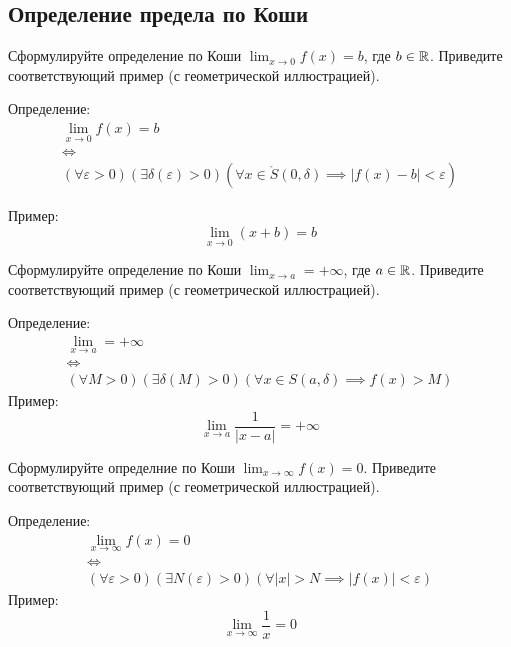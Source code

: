 \subsection{Определение предела по Коши}

\begin{question}
  Сформулируйте определение по Коши $\lim_{x \to 0} f(x) = b$, где $b \in \mathbb{R}$.
Приведите соответствующий пример (с геометрической иллюстрацией).
\end{question}
\begin{answer}
  Определение:
  \begin{gather*}
    \lim_{x \to 0} f(x) = b \\
    \iff \\
    (\forall \varepsilon > 0)(\exists \delta(\varepsilon) > 0)(\forall x \in \mathring{S}(0, \delta) \implies |f(x) - b| < \varepsilon)
  \end{gather*}

  Пример: \[
    \lim_{x \to 0} (x + b) = b  
  \] 
\end{answer}

\begin{question}
  Сформулируйте определение по Коши $\lim_{x \to a} = +\infty$, где $a \in \mathbb{R}$.
Приведите соответствующий пример (с геометрической иллюстрацией).
\end{question}
\begin{answer}
  Определение:
  \begin{gather*}
    \lim_{x \to a} = +\infty \\
    \iff \\
    (\forall M > 0)(\exists \delta(M) > 0)(\forall x \in S(a, \delta) \implies f(x) > M) 
  \end{gather*}
  Пример: \[
  \lim_{x \to a} \frac{1}{|x - a|} = +\infty
  \] 
\end{answer}

\begin{question}
  Сформулируйте определние по Коши $\lim_{x \to \infty} f(x) = 0$.
Приведите соответствующий пример (с геометрической иллюстрацией).
\end{question}
\begin{answer}
  Определение:
  \begin{gather*}
    \lim_{x \to \infty} f(x) = 0 \\
    \iff \\
    (\forall \varepsilon > 0)(\exists N(\varepsilon) > 0)(\forall |x| > N \implies |f(x)| < \varepsilon)
  \end{gather*}
  Пример: \[
    \lim_{x \to \infty} \frac{1}{x} = 0
  \] 
\end{answer}
  
